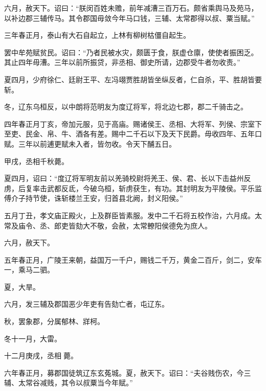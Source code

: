 \documentclass[12pt,UTF8]{ctexbook}
\begin{document}
六月，赦天下。诏曰：“朕闵百姓未赡，前年减漕三百万石。颇省乘舆马及苑马，以补边郡三辅传马。其令郡国毋敛今年马口钱，三辅、太常郡得以叔、粟当赋。”



三年春正月，泰山有大石自起立，上林有柳树枯僵自起生。



罢中牟苑赋贫民。诏曰：“乃者民被水灾，颇匮于食，朕虚仓廪，使使者振困乏。其止四年毋漕。三年以前所振贷，非丞相、御史所请，边郡受牛者勿收责。”



夏四月，少府徐仁、廷尉王平、左冯翊贾胜胡皆坐纵反者，仁自杀，平、胜胡皆要斩。



冬，辽东乌桓反，以中朗将范明友为度辽将军，将北边七郡，郡二千骑击之。



四年春正月丁亥，帝加元服，见于高庙。赐诸侯王、丞相、大将军、列侯、宗室下至吏、民金、帛、牛、酒各有差。赐中二千石以下及天下民爵。毋收四年、五年口赋。三年以前逋更赋未入者，皆勿收。令天下酺五日。



甲戌，丞相千秋薨。



夏四月，诏曰：“度辽将军明友前以羌骑校尉将羌王、侯、君、长以下击益州反虏，后复率击武都反氐，今破乌桓，斩虏获生，有功。其封明友为平陵侯。平乐监傅介子持节使，诛斩楼兰王安，归首县北阙，封义阳侯。”



五月丁丑，孝文庙正殿火，上及群臣皆素服。发中二千石将五校作治，六月成。太常及庙令、丞、郎吏皆劾大不敬，会赦，太常轑阳侯德免为庶人。



六月，赦天下。



五年春正月，广陵王来朝，益国万一千户，赐钱二千万，黄金二百斤，剑二，安车一，乘马二驷。



夏，大旱。



六月，发三辅及郡国恶少年吏有告劾亡者，屯辽东。



秋，罢象郡，分属郁林、牂柯。



冬十一月，大雷。



十二月庚戌，丞相薨。



六年春正月，募郡国徒筑辽东玄菟城。夏，赦天下。诏曰：“夫谷贱伤农，今三辅、太常谷减贱，其令以叔粟当今年赋。”
\end{document}

